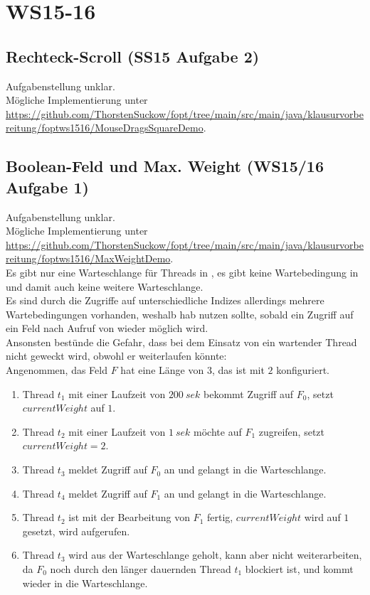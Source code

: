 \chapter{WS15-16}\label{ch:klausurws5-16}

\section{Rechteck-Scroll (SS15 Aufgabe 2)}

Aufgabenstellung unklar.\\
Mögliche Implementierung unter \url{https://github.com/ThorstenSuckow/fopt/tree/main/src/main/java/klausurvorbereitung/foptws1516/MouseDragsSquareDemo}.

\section{Boolean-Feld und Max. Weight (WS15/16 Aufgabe 1)}

Aufgabenstellung unklar.\\
Mögliche Implementierung unter \url{https://github.com/ThorstenSuckow/fopt/tree/main/src/main/java/klausurvorbereitung/foptws1516/MaxWeightDemo}.\\

\noindent
Es gibt nur eine Warteschlange für Threads in , es gibt keine Wartebedingung in  und damit auch keine weitere Warteschlange.\\
Es sind durch die Zugriffe auf unterschiedliche Indizes allerdings mehrere Wartebedingungen vorhanden, weshalb hab  nutzen sollte,
sobald ein Zugriff auf ein Feld nach Aufruf von  wieder möglich wird.\\
Ansonsten bestünde die Gefahr, dass bei dem Einsatz von  ein wartender Thread nicht geweckt wird, obwohl er weiterlaufen könnte:\\
Angenommen, das Feld $F$ hat eine Länge von $3$, das  ist mit $2$ konfiguriert.
\begin{enumerate}
 \item Thread $t_1$ mit einer Laufzeit von $200\ sek$ bekommt Zugriff auf $F_0$, setzt $currentWeight$ auf $1$.
 \item Thread $t_2$ mit einer Laufzeit von $1\ sek$ möchte auf $F_1$ zugreifen, setzt $currentWeight=2$.
 \item Thread $t_3$ meldet Zugriff auf $F_0$ an und gelangt in die Warteschlange.
 \item Thread $t_4$ meldet Zugriff auf $F_1$ an und gelangt in die Warteschlange.
 \item Thread $t_2$ ist mit der Bearbeitung von $F_1$ fertig, $currentWeight$ wird auf $1$ gesetzt,  wird aufgerufen.
 \item Thread $t_3$ wird aus der Warteschlange geholt, kann aber nicht weiterarbeiten, da $F_0$ noch durch den länger dauernden Thread $t_1$ blockiert ist, und kommt wieder in die Warteschlange.
\end{enumerate}

